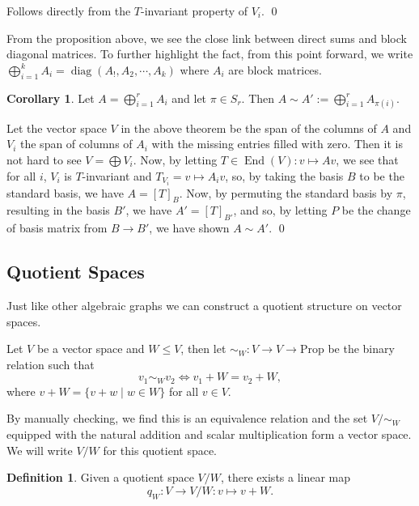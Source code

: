 \documentclass[
]{article}
\theoremstyle{definition}
\newtheorem{corollary}{Corollary}[theorem]
\theoremstyle{definition}
\newtheorem{definition}{Definition}[section]
\begin{document}
Follows directly from the \(T\)-invariant property of \(V_i\). \qed

From the proposition above, we see the close link between direct sums
and block diagonal matrices. To further highlight the fact, from this
point forward, we write
\(\bigoplus_{i = 1}^k A_i = \mathop{\mathrm{diag}}(A_!, A_2, \cdots, A_k)\)
where \(A_i\) are block matrices.

\begin{corollary}
  Let \(A = \bigoplus_{i = 1}^r A_i\) and let \(\pi \in S_r\). Then 
  \(A \sim A' := \bigoplus_{i = 1}^r A_{\pi(i)}\).
\end{corollary}
\proof

Let the vector space \(V\) in the above theorem be the span of the
columns of \(A\) and \(V_i\) the span of columns of \(A_i\) with the
missing entries filled with zero. Then it is not hard to see
\(V = \bigoplus V_i\). Now, by letting
\(T \in \mathop{\mathrm{End}}(V) : v \mapsto A v\), we see that for all
\(i\), \(V_i\) is \(T\)-invariant and \(T_{V_i} = v \mapsto A_i v\), so,
by taking the basis \(B\) to be the standard basis, we have
\(A = [T]_B\). Now, by permuting the standard basis by \(\pi\),
resulting in the basis \(B'\), we have \(A' = [T]_{B'}\), and so, by
letting \(P\) be the change of basis matrix from \(B \to B'\), we have
shown \(A \sim A'\). \qed

\hypertarget{quotient-spaces}{%
\subsection{Quotient Spaces}\label{quotient-spaces}}

Just like other algebraic graphs we can construct a quotient structure
on vector spaces.

Let \(V\) be a vector space and \(W \le V\), then let
\(\sim_W : V \to V \to \text{Prop}\) be the binary relation such that
\[v_1 \sim_W v_2 \iff v_1 + W = v_2 + W,\] where
\(v + W = \{v + w \mid w \in W\}\) for all \(v \in V\).

By manually checking, we find this is an equivalence relation and the
set \(V / \sim_W\) equipped with the natural addition and scalar
multiplication form a vector space. We will write \(V / W\) for this
quotient space.

\begin{definition}
  Given a quotient space \(V / W\), there exists a linear map
  \[q_W : V \to V / W : v \mapsto v + W.\]
\end{definition}
\end{document}
